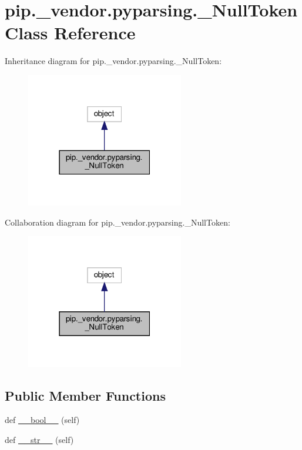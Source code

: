 \hypertarget{classpip_1_1__vendor_1_1pyparsing_1_1__NullToken}{}\section{pip.\+\_\+vendor.\+pyparsing.\+\_\+\+Null\+Token Class Reference}
\label{classpip_1_1__vendor_1_1pyparsing_1_1__NullToken}


Inheritance diagram for pip.\+\_\+vendor.\+pyparsing.\+\_\+\+Null\+Token\+:
\nopagebreak
\begin{figure}[H]
\begin{center}
\leavevmode
\includegraphics[width=195pt]{classpip_1_1__vendor_1_1pyparsing_1_1__NullToken__inherit__graph}
\end{center}
\end{figure}


Collaboration diagram for pip.\+\_\+vendor.\+pyparsing.\+\_\+\+Null\+Token\+:
\nopagebreak
\begin{figure}[H]
\begin{center}
\leavevmode
\includegraphics[width=195pt]{classpip_1_1__vendor_1_1pyparsing_1_1__NullToken__coll__graph}
\end{center}
\end{figure}
\subsection*{Public Member Functions}
\begin{DoxyCompactItemize}
\item 
def \hyperlink{classpip_1_1__vendor_1_1pyparsing_1_1__NullToken_ac614059193ed07b5c856c3b457e96cc3}{\+\_\+\+\_\+bool\+\_\+\+\_\+} (self)
\item 
def \hyperlink{classpip_1_1__vendor_1_1pyparsing_1_1__NullToken_a739df7618e33b7a490189cb01898c0f2}{\+\_\+\+\_\+str\+\_\+\+\_\+} (self)
\end{DoxyCompactItemize}


